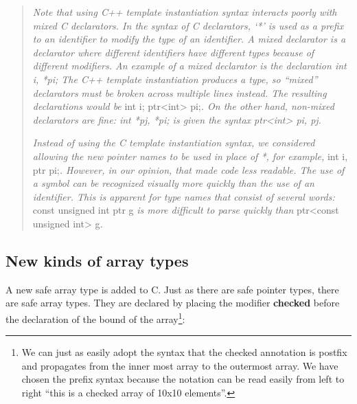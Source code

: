 \documentclass[]{article}
\begin{document}
\begin{quote}
\emph{Note that using C++ template instantiation syntax interacts poorly
with mixed C declarators. In the syntax of C declarators, `*' is used as
a prefix to an identifier to modify the type of an identifier. A mixed
declarator is a declarator where different identifiers have different
types because of different modifiers. An example of a mixed declarator
is the declaration int i, *pi; The C++ template instantiation produces a
type, so ``mixed'' declarators} \emph{must be broken across multiple
lines instead. The resulting declarations would be} int i;
ptr\textless{}int\textgreater{} pi;\emph{. On the other hand, non-mixed
declarators are fine: int *pj, *pi; is given the syntax
ptr\textless{}int\textgreater{} pi, pj.}

\emph{Instead of using the C template instantiation syntax, we
considered allowing the new pointer names to be used in place of *, for
example,} int i, ptr pi;\emph{. However, in our opinion, that made code
less readable. The use of a symbol can be recognized visually more
quickly than the use of an identifier. This is apparent for type names
that consist of several words:} const unsigned int ptr g \emph{is more
difficult to parse quickly than} ptr\textless{}const unsigned
int\textgreater{} g\emph{.}
\end{quote}

\subsection{\texorpdfstring{\protect\hypertarget{ux5fToc424307678}{}{\protect\hypertarget{ux5fToc426641056}{}{\protect\hypertarget{ux5fToc435434916}{}{\protect\hypertarget{ux5fToc437460737}{}{\protect\hypertarget{ux5fToc440445411}{}{\protect\hypertarget{ux5fToc440449193}{}{\protect\hypertarget{ux5fToc440551843}{}{\protect\hypertarget{ux5fToc422906956}{}{\protect\hypertarget{ux5fToc420589173}{}{}}}}}}}}}New
kinds of array
types}{New kinds of array types}}\label{new-kinds-of-array-types}

A new safe array type is added to C. Just as there are safe pointer
types, there are safe array types. They are declared by placing the
modifier \textbf{checked} before the declaration of the bound of the
array\footnote{We can just as easily adopt the syntax that the checked
  annotation is postfix and propagates from the inner most array to the
  outermost array. We have chosen the prefix syntax because the notation
  can be read easily from left to right ``this is a checked array of
  10x10 elements''.}:
\end{document}
